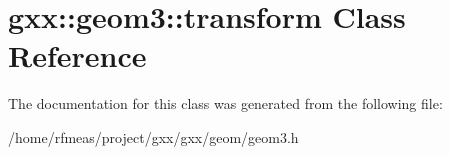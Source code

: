 \hypertarget{classgxx_1_1geom3_1_1transform}{}\section{gxx\+:\+:geom3\+:\+:transform Class Reference}
\label{classgxx_1_1geom3_1_1transform}


The documentation for this class was generated from the following file\+:\begin{DoxyCompactItemize}
\item 
/home/rfmeas/project/gxx/gxx/geom/geom3.\+h\end{DoxyCompactItemize}
